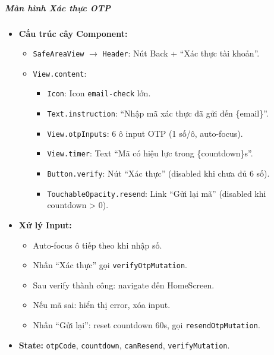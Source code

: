 \subparagraph{Màn hình Xác thực OTP}
\begin{itemize}
    \item \textbf{Cấu trúc cây Component:}
        \begin{itemize}
            \item \texttt{SafeAreaView} $\rightarrow$ \texttt{Header}: Nút Back + ``Xác thực tài khoản''.
            \item \texttt{View.content}:
                \begin{itemize}
                    \item \texttt{Icon}: Icon \texttt{email-check} lớn.
                    \item \texttt{Text.instruction}: ``Nhập mã xác thực đã gửi đến \{email\}''.
                    \item \texttt{View.otpInputs}: 6 ô input OTP (1 số/ô, auto-focus).
                    \item \texttt{View.timer}: Text ``Mã có hiệu lực trong \{countdown\}s''.
                    \item \texttt{Button.verify}: Nút ``Xác thực'' (disabled khi chưa đủ 6 số).
                    \item \texttt{TouchableOpacity.resend}: Link ``Gửi lại mã'' (disabled khi countdown > 0).
                \end{itemize}
        \end{itemize}
    \item \textbf{Xử lý Input:}
        \begin{itemize}
            \item Auto-focus ô tiếp theo khi nhập số.
            \item Nhấn ``Xác thực'' gọi \texttt{verifyOtpMutation}.
            \item Sau verify thành công: navigate đến HomeScreen.
            \item Nếu mã sai: hiển thị error, xóa input.
            \item Nhấn ``Gửi lại'': reset countdown 60s, gọi \texttt{resendOtpMutation}.
        \end{itemize}
    \item \textbf{State:} \texttt{otpCode}, \texttt{countdown}, \texttt{canResend}, \texttt{verifyMutation}.
\end{itemize}

